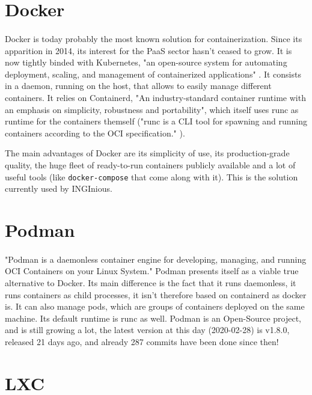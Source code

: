 \section{Docker}
\paragraph{}Docker\cite{merkel2014docker} is today probably the most known solution for containerization.  Since its apparition in 2014, its interest for the PaaS sector hasn't ceased to grow.  It is now tightly binded with Kubernetes, "an open-source system for automating deployment, scaling, and management of containerized applications" \cite{kubernetes}.  It consists in a daemon, running on the host, that allows to easily manage different containers.  It relies on Containerd, "An industry-standard container runtime with an emphasis on simplicity, robustness and portability"\cite{containerd}, which itself uses runc as runtime for the containers themself ("runc is a CLI tool for spawning and running containers according to the OCI specification." \cite{runc}).

The main advantages of Docker are its simplicity of use, its production-grade quality, the huge fleet of ready-to-run containers publicly available and a lot of useful tools (like \texttt{docker-compose} that come along with it).  This is the solution currently used by INGInious.

\section{Podman}
\paragraph{}"Podman is a daemonless container engine for developing, managing, and running OCI\cite{oci} Containers on your Linux System."\cite{podman}  Podman presents itself as a viable true alternative to Docker.  Its main difference is the fact that it runs daemonless, it runs containers as child processes, it isn't therefore based on containerd as docker is.  It can also manage pods, which are groups of containers deployed on the same machine. Its default runtime is runc as well.  Podman is an Open-Source project, and is still growing a lot, the latest version at this day (2020-02-28) is v1.8.0, released 21 days ago, and already 287 commits have been done since then!

\section{LXC}
